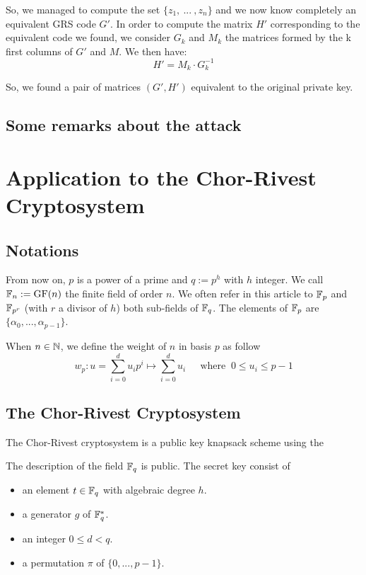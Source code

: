 \documentclass[a4paper]{article}
\newcommand{\GF}[1]{\F_{#1}}
\begin{document}
So, we managed to compute the set $\{ z_1, \ ... \ ,z_n \}$ and we now know completely an equivalent GRS code $G'$. In order to compute the matrix $H'$ corresponding to the equivalent code we found, we consider
$G_{k}$ and $M_{k}$ the matrices formed by the k first columns of $G'$ and $M$. We then have:
$$H' = M_{k}\cdot G_{k}^{-1}$$

So, we found a pair of matrices $(G',H')$ equivalent to the original private key.

\subsection{Some remarks about the attack}

\newpage
\section{Application to the Chor-Rivest Cryptosystem}
\label{sec:CRcrypt}

\subsection{Notations}

From now on, $p$ is a power of a prime and $q := p^h$ with $h$ integer. We call $\mathbb{F}_n := \text{GF}(n)$ the finite field of order $n$. We often refer in this article to $\mathbb{F}_p$ and $\mathbb{F}_{p^r}$ (with $r$ a divisor of $h$) both sub-fields of $\mathbb{F}_q$. The elements of $\mathbb{F}_p$ are $\{ \alpha_0, ... , \alpha_{p-1} \}$.

When $n \in \mathbb{N}$, we define the weight of $n$ in basis $p$ as follow
$$ w_p : u = \sum_{i=0}^{d} u_i p^i \longmapsto \sum_{i=0}^{d} u_i \ \ \ \ \ \text{ where }  \ 0 \leq u_i \leq p-1 $$

\subsection{The Chor-Rivest Cryptosystem}

The Chor-Rivest cryptosystem is a public key knapsack scheme using the 


The description of the field $\mathbb{F}_q$ is public. The secret key consist of
\begin{itemize}
\item an element $t \in \GF{q}$ with algebraic degree $h$.
\item a generator $g$ of $\GF{q}^{*}$.
\item an integer $0 \leq d < q$.
\item a permutation $\pi$ of $\{ 0, ... , p-1 \}$.
\end{itemize}
\end{document}
